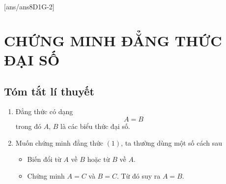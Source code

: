 [ans/ans8D1G-2]
\section{CHỨNG MINH ĐẲNG THỨC ĐẠI SỐ}
\subsection{Tóm tắt lí thuyết}
\begin{enumerate}
\item Đẳng thức có dạng \[A=B\tag{1}\]
trong đó $A$, $B$ là các biểu thức đại số.
\item Muốn chứng minh đẳng thức $(1)$, ta thường dùng một số cách sau
\begin{itemize}
\item Biến đổi từ $A$ về $B$ hoặc từ $B$ về $A$.
\item Chứng minh $A=C$ và $B=C$. Từ đó suy ra $A=B$.
\end{itemize}
\end{enumerate}
